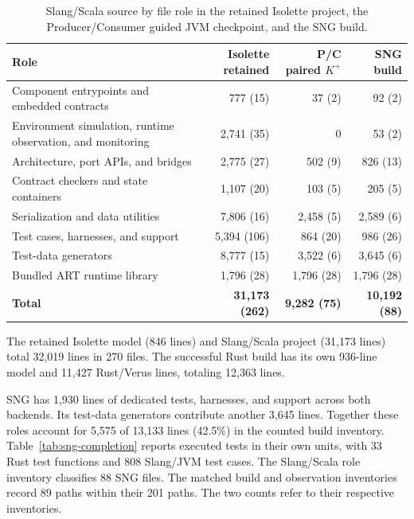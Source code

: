 \begin{table}[!htbp]
\caption{Slang/Scala source by file role in the retained Isolette project, the Producer/Consumer guided JVM checkpoint, and the SNG build.}
\label{tab:role-slang}
\centering\small
\setlength{\tabcolsep}{4pt}
\begin{tabular}{@{}>{\raggedright\arraybackslash}p{.50\linewidth}rrr@{}}
\toprule
Role & \shortstack[r]{Isolette\\retained} & \shortstack[r]{P/C\\paired $K^{+}$} & \shortstack[r]{SNG\\build} \\
\midrule
Component entrypoints and embedded contracts & 777 (15) & 37 (2) & 92 (2) \\
Environment simulation, runtime observation, and monitoring & 2,741 (35) & 0 & 53 (2) \\
Architecture, port APIs, and bridges & 2,775 (27) & 502 (9) & 826 (13) \\
Contract checkers and state containers & 1,107 (20) & 103 (5) & 205 (5) \\
Serialization and data utilities & 7,806 (16) & 2,458 (5) & 2,589 (6) \\
Test cases, harnesses, and support & 5,394 (106) & 864 (20) & 986 (26) \\
Test-data generators & 8,777 (15) & 3,522 (6) & 3,645 (6) \\
Bundled ART runtime library & 1,796 (28) & 1,796 (28) & 1,796 (28) \\
\midrule
\textbf{Total} & \textbf{31,173 (262)} & \textbf{9,282 (75)} & \textbf{10,192 (88)} \\
\bottomrule
\end{tabular}
\end{table}

The retained Isolette model (846 lines) and Slang/Scala project (31,173 lines) total 32,019 lines in 270 files. The successful Rust build has its own 936-line model and 11,427 Rust/Verus lines, totaling 12,363 lines.

SNG has 1,930 lines of dedicated tests, harnesses, and support across both backends. Its test-data generators contribute another 3,645 lines. Together these roles account for 5,575 of 13,133 lines (42.5\%) in the counted build inventory. Table~\ref{tab:sng-completion} reports executed tests in their own units, with 33 Rust test functions and 808 Slang/JVM test cases. The Slang/Scala role inventory classifies 88 SNG files. The matched build and observation inventories record 89  paths within their 201 paths. The two counts refer to their respective inventories.
